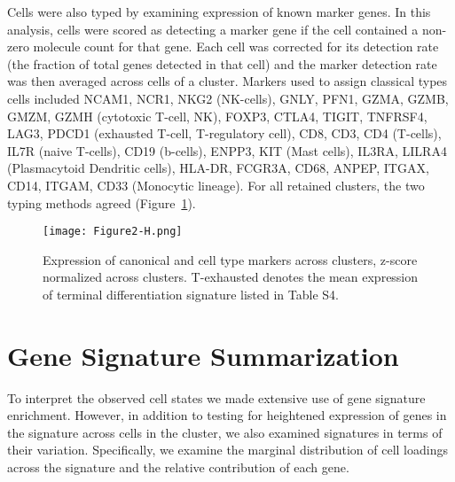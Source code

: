 Cells were also typed by examining expression of known marker genes.
In this analysis, cells were scored as detecting a marker gene if the cell contained a non-zero molecule count for that gene.
Each cell was corrected for its detection rate (the fraction of total genes detected in that cell) and the marker detection rate was then averaged across cells of a cluster.
Markers used to assign classical types cells included NCAM1, NCR1, NKG2 (NK-cells), GNLY, PFN1, GZMA, GZMB, GMZM, GZMH (cytotoxic T-cell, NK), FOXP3, CTLA4, TIGIT, TNFRSF4, LAG3, PDCD1 (exhausted T-cell, T-regulatory cell), CD8, CD3, CD4 (T-cells), IL7R (naive T-cells), CD19 (b-cells), ENPP3, KIT (Mast cells), IL3RA, LILRA4 (Plasmacytoid Dendritic cells), HLA-DR, FCGR3A, CD68, ANPEP, ITGAX, CD14, ITGAM, CD33 (Monocytic lineage).
For all retained clusters, the two typing methods agreed (Figure~\ref{fig:2h}).

\begin{figure}
\centering
\texttt{[image: Figure2-H.png]}
\caption{Expression of canonical and cell type markers across clusters, z-score normalized across clusters. T-exhausted denotes the mean expression of terminal differentiation signature listed in Table S4.
} %
\label{fig:2h}
\end{figure}

\section{Gene Signature Summarization}

To interpret the observed cell states we made extensive use of gene signature enrichment.  
However, in addition to testing for heightened expression of genes in the signature across cells in the cluster, we also examined signatures in terms of their variation.
Specifically, we examine the marginal distribution of cell loadings across the signature and the relative contribution of each gene.

